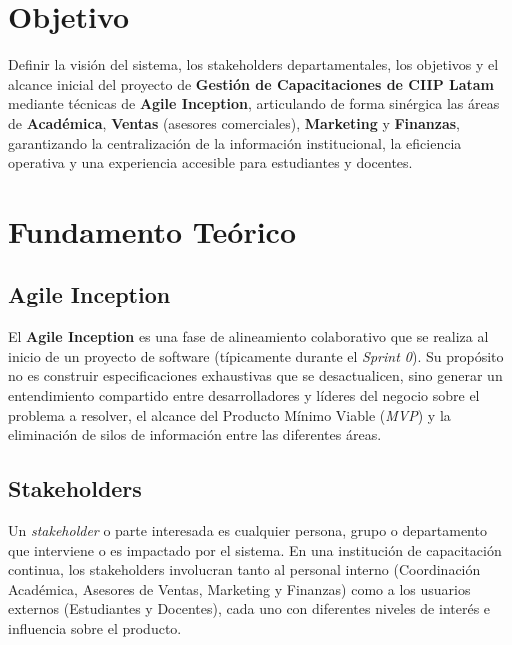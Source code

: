 \documentclass[11pt,a4paper]{article}
\begin{document}
\newpage
{}
\tableofcontents
\newpage
{}

\section{Objetivo}
Definir la visión del sistema, los stakeholders departamentales, los objetivos y el alcance inicial del proyecto de \textbf{Gestión de Capacitaciones de CIIP Latam} mediante técnicas de \textbf{Agile Inception}, articulando de forma sinérgica las áreas de \textbf{Académica}, \textbf{Ventas} (asesores comerciales), \textbf{Marketing} y \textbf{Finanzas}, garantizando la centralización de la información institucional, la eficiencia operativa y una experiencia accesible para estudiantes y docentes.

\section{Fundamento Teórico}

\subsection{Agile Inception}
El \textbf{Agile Inception} es una fase de alineamiento colaborativo que se realiza al inicio de un proyecto de software (típicamente durante el \textit{Sprint 0}). Su propósito no es construir especificaciones exhaustivas que se desactualicen, sino generar un entendimiento compartido entre desarrolladores y líderes del negocio sobre el problema a resolver, el alcance del Producto Mínimo Viable (\textit{MVP}) y la eliminación de silos de información entre las diferentes áreas.

\subsection{Stakeholders}
Un \textit{stakeholder} o parte interesada es cualquier persona, grupo o departamento que interviene o es impactado por el sistema. En una institución de capacitación continua, los stakeholders involucran tanto al personal interno (Coordinación Académica, Asesores de Ventas, Marketing y Finanzas) como a los usuarios externos (Estudiantes y Docentes), cada uno con diferentes niveles de interés e influencia sobre el producto.
\end{document}
